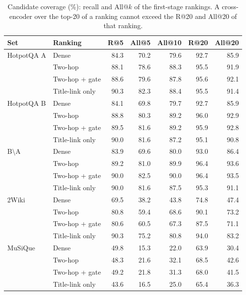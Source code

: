 \begin{table}[t]
\centering
\footnotesize
\caption{Candidate coverage (\%): recall and All@$k$ of the first-stage rankings. A cross-encoder over the top-20 of a ranking cannot exceed the R@20 and All@20 of that ranking.}
\label{tab:coverage}
\begin{tabular}{llrrrrr}
\toprule
Set & Ranking & R@5 & All@5 & All@10 & R@20 & All@20 \\
\midrule
HotpotQA A & Dense & 84.3 & 70.2 & 79.6 & 92.7 & 85.9 \\
 & Two-hop & 88.1 & 78.6 & 88.3 & 95.5 & 91.9 \\
 & Two-hop + gate & 88.6 & 79.6 & 87.8 & 95.6 & 92.1 \\
 & Title-link only & 90.3 & 82.3 & 88.4 & 95.5 & 91.4 \\
\midrule
HotpotQA B & Dense & 84.1 & 69.8 & 79.7 & 92.7 & 85.9 \\
 & Two-hop & 88.8 & 80.3 & 89.2 & 96.0 & 92.9 \\
 & Two-hop + gate & 89.5 & 81.6 & 89.2 & 95.9 & 92.8 \\
 & Title-link only & 90.0 & 81.6 & 87.2 & 95.1 & 90.8 \\
\midrule
B$\setminus$A & Dense & 83.9 & 69.6 & 80.0 & 93.0 & 86.4 \\
 & Two-hop & 89.2 & 81.0 & 89.9 & 96.4 & 93.6 \\
 & Two-hop + gate & 90.0 & 82.5 & 90.0 & 96.4 & 93.5 \\
 & Title-link only & 90.0 & 81.6 & 87.5 & 95.3 & 91.1 \\
\midrule
2Wiki & Dense & 69.5 & 38.2 & 43.8 & 74.8 & 47.4 \\
 & Two-hop & 80.8 & 59.4 & 68.6 & 90.1 & 73.2 \\
 & Two-hop + gate & 80.6 & 60.5 & 67.3 & 87.5 & 71.1 \\
 & Title-link only & 90.3 & 75.2 & 80.8 & 94.0 & 83.2 \\
\midrule
MuSiQue & Dense & 49.8 & 15.3 & 22.0 & 63.9 & 30.4 \\
 & Two-hop & 48.3 & 21.6 & 32.1 & 68.5 & 42.6 \\
 & Two-hop + gate & 49.2 & 21.8 & 31.3 & 68.0 & 41.5 \\
 & Title-link only & 43.6 & 16.5 & 25.0 & 65.4 & 36.3 \\

\bottomrule
\end{tabular}
\end{table}
